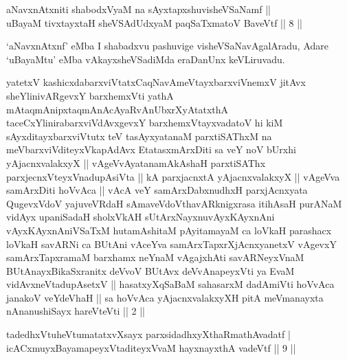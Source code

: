 
\begin{shl}
aNavxnAtxniti shabodxV\s yaM na sAyxtapxshuvisheVSaNamf || \\
uBayaM tivxtayxtaH sheVSAdUdxyaM paqSaTxmatoV BaveVtf \hfill ||  8 ||  
\end{shl}

\begin{artha}
`aNavxnAtxnf' eMba I shabadxvu pashuvige visheVSaNavAgalAradu, Adare `uBayaMtu' eMba vAkayxsheVSadiMda eraDanUnx keVLiruvadu.
\end{artha}


\begin{kandikeshl}
yatetxV kashicxdabarxviVtatxCaqNavAmeVtayxbarxviVnemxV jitAvx sheYlinivARgevxY barxhemxVti yathA mAtaqmAnipxtaqmAnAcAyaRvAnUbxrXyAtatxthA taceCxYlinirabarxviVdAvxgevxY barxhemxVtayxvadatoV hi kiM sAyxditayxbarxviVtutx teV tasAyxyatanaM parxtiSAThxM na meV\s barxviVditeyxVkapAdAvx EtatasxmArxDiti sa veY noV bUrxhi yAjacnxvalakxyX || vAgeVvAyatanamAkAshaH parxtiSAThx parxjecnxVteyxVnadupAsiVta || kA parxjacnxtA yAjacnxvalakxyX || vAgeVva samArxDiti hoVvAca || vAcA veY samArxDabxnudhxH parxjAcnxyata QugevxVdoV yajuveVRdaH sAmaveVdoV\s thavARknigxrasa itihAsaH purANaM vidAyx upaniSadaH sholxVkAH sUtArxNayxnuvAyxKAyxnAni vAyxKAyxnAniVSaTxM hutamAshitaM pAyitamayaM ca loVkaH parashacx loVkaH savARNi ca BUtAni vAceYva samArxTapxrXjAcnxyanetxV vAgevxY samArxTapxramaM barxhamx neYnaM vAgajxhAti savARNeyxVnaM BUtAnayxBikaSxranitx deVvoV BUtAvx deVvAnapeyxVti ya EvaM vidAvxneVtadupAsetxV || hasatxyXqSaBaM sahasarxM dadAmiVti hoVvAca janakoV veYdeVhaH || sa hoVvAca yAjacnxvalakxyXH pitA meV\s manayxta nAnanushiSayx hareVteVti || 2 ||
\end{kandikeshl}




\begin{shl}
tadedhxVtuheVtumatatxvXsayx parxsidadhxyXthaRmathAvadatf |\\
icACxmuyxBayamapeyxVtaditeyxVvaM hayxnayxthA vadeVtf \hfill || 9 || 
\end{shl}

